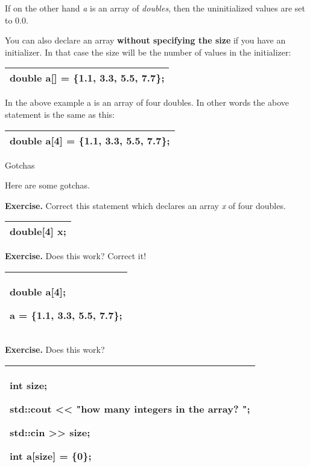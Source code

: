 \documentclass[
]{article}
\begin{document}
If on the other hand \emph{a} is an array of \emph{doubles}, then the
uninitialized values are set to 0.0.

You can also declare an array \textbf{without specifying the size} if
you have an initializer. In that case the size will be the number of
values in the initializer:

\begin{longtable}[]{@{}l@{}}
\toprule
\endhead
double a{[}{]} = \{1.1, 3.3, 5.5, 7.7\}; \tabularnewline
\bottomrule
\end{longtable}

In the above example a is an array of four doubles. In other words the
above statement is the same as this:

\begin{longtable}[]{@{}l@{}}
\toprule
\endhead
double a{[}4{]} = \{1.1, 3.3, 5.5, 7.7\}; \tabularnewline
\bottomrule
\end{longtable}

Gotchas

Here are some gotchas.

\textbf{Exercise.} Correct this statement which declares an array
\emph{x} of four doubles.

\begin{longtable}[]{@{}l@{}}
\toprule
\endhead
double{[}4{]} x;\tabularnewline
\bottomrule
\end{longtable}

\textbf{Exercise.} Does this work? Correct it!

\begin{longtable}[]{@{}l@{}}
\toprule
\endhead
\begin{minipage}[t]{0.97\columnwidth}\raggedright
double a{[}4{]};

a = \{1.1, 3.3, 5.5, 7.7\};\strut
\end{minipage}\tabularnewline
\bottomrule
\end{longtable}

\textbf{Exercise.} Does this work?

\begin{longtable}[]{@{}l@{}}
\toprule
\endhead
\begin{minipage}[t]{0.97\columnwidth}\raggedright
int size;

std::cout \textless\textless{} "how many integers in the array? ";

std::cin \textgreater\textgreater{} size;

int a{[}size{]} = \{0\};\strut
\end{minipage}\tabularnewline
\bottomrule
\end{longtable}
\end{document}
